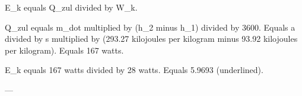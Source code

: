 E_k equals Q_zul divided by W_k.  

Q_zul equals m_dot multiplied by (h_2 minus h_1) divided by 3600.  
Equals a divided by s multiplied by (293.27 kilojoules per kilogram minus 93.92 kilojoules per kilogram).  
Equals 167 watts.  

E_k equals 167 watts divided by 28 watts.  
Equals 5.9693 (underlined).

---
